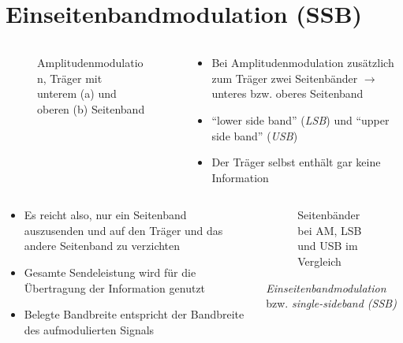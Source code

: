 
\section{Einseitenbandmodulation (SSB)}
\label{section:ssb}
\begin{frame}%

\begin{columns}
    \begin{column}{0.48\textwidth}
    
\begin{figure}
    \caption{\scriptsize Amplitudenmodulation, Träger mit unterem (a) und oberen (b) Seitenband}
    \label{n_seitenband}
\end{figure}


    \end{column}
   \begin{column}{0.48\textwidth}
       \begin{itemize}
  \item Bei Amplitudenmodulation zusätzlich zum Träger zwei Seitenbänder $\rightarrow$ unteres bzw. oberes Seitenband
  \item \enquote{lower side band} (\emph{LSB}) und \enquote{upper side band} (\emph{USB})
  \item Der Träger selbst enthält gar keine Information
  \end{itemize}

   \end{column}
\end{columns}

\end{frame}

\begin{frame}
\begin{columns}
    \begin{column}{0.48\textwidth}
    \begin{itemize}
  \item Es reicht also, nur ein Seitenband auszusenden und auf den Träger und das andere Seitenband zu verzichten
  \item Gesamte Sendeleistung wird für die Übertragung der Information genutzt
  \item Belegte Bandbreite entspricht der Bandbreite des aufmodulierten Signals
  \end{itemize}

    \end{column}
   \begin{column}{0.48\textwidth}
       
\begin{figure}
    \caption{\scriptsize Seitenbänder bei AM, LSB und USB im Vergleich}
    \label{n_seitenband}
\end{figure}

\emph{Einseitenbandmodulation} bzw. \emph{single-sideband (SSB)}


   \end{column}
\end{columns}

\end{frame}

